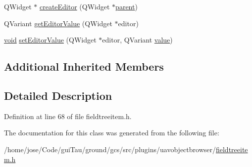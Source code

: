 \begin{DoxyCompactItemize}
\item 
Q\-Widget $\ast$ \hyperlink{group___u_a_v_object_browser_plugin_ga44f6457ccf2e1741aef853d851162981}{create\-Editor} (Q\-Widget $\ast$\hyperlink{group___u_a_v_object_browser_plugin_gaa3a7ba624312b6be70872634db291881}{parent})
\item 
Q\-Variant \hyperlink{group___u_a_v_object_browser_plugin_ga90464609dbac318a21de05cc0b906c6d}{get\-Editor\-Value} (Q\-Widget $\ast$editor)
\item 
\hyperlink{group___u_a_v_objects_plugin_ga444cf2ff3f0ecbe028adce838d373f5c}{void} \hyperlink{group___u_a_v_object_browser_plugin_gaf34de2505125e49c75e2f4623cdaa726}{set\-Editor\-Value} (Q\-Widget $\ast$editor, Q\-Variant \hyperlink{glext_8h_aa0e2e9cea7f208d28acda0480144beb0}{value})
\end{DoxyCompactItemize}
\subsection*{Additional Inherited Members}


\subsection{Detailed Description}


Definition at line 68 of file fieldtreeitem.\-h.



The documentation for this class was generated from the following file\-:\begin{DoxyCompactItemize}
\item 
/home/jose/\-Code/gui\-Tau/ground/gcs/src/plugins/uavobjectbrowser/\hyperlink{fieldtreeitem_8h}{fieldtreeitem.\-h}\end{DoxyCompactItemize}
